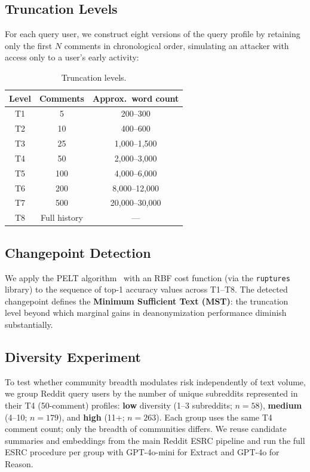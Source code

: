 \documentclass[sigplan,screen,nonacm]{acmart}
\begin{document}
\subsection{Truncation Levels}
For each query user, we construct eight versions of the query profile by retaining
only the first $N$ comments in chronological order, simulating an attacker with
access only to a user's early activity:

\begin{table}[H]
\centering
\caption{Truncation levels.}
\begin{tabular}{ccc}
\toprule
Level & Comments & Approx.\ word count \\
\midrule
T1 & 5   & 200--300 \\
T2 & 10  & 400--600 \\
T3 & 25  & 1{,}000--1{,}500 \\
T4 & 50  & 2{,}000--3{,}000 \\
T5 & 100 & 4{,}000--6{,}000 \\
T6 & 200 & 8{,}000--12{,}000 \\
T7 & 500 & 20{,}000--30{,}000 \\
T8 & Full history & --- \\
\bottomrule
\end{tabular}
\end{table}

\subsection{Changepoint Detection}
We apply the PELT algorithm~\cite{truong2020} with an RBF cost function (via the
\texttt{ruptures} library) to the sequence of top-1 accuracy values across T1--T8.
The detected changepoint defines the \textbf{Minimum Sufficient Text (MST)}:
the truncation level beyond which marginal gains in deanonymization performance
diminish substantially.

\subsection{Diversity Experiment}
To test whether community breadth modulates risk independently of text volume, we
group Reddit query users by the number of unique subreddits represented in their T4
(50-comment) profiles: \textbf{low} diversity (1--3 subreddits; $n = 58$),
\textbf{medium} (4--10; $n = 179$), and \textbf{high} (11+; $n = 263$). Each group
uses the same T4 comment count; only the breadth of communities differs. We reuse
candidate summaries and embeddings from the main Reddit ESRC pipeline and run the
full ESRC procedure per group with GPT-4o-mini for Extract and GPT-4o for Reason.
\end{document}
